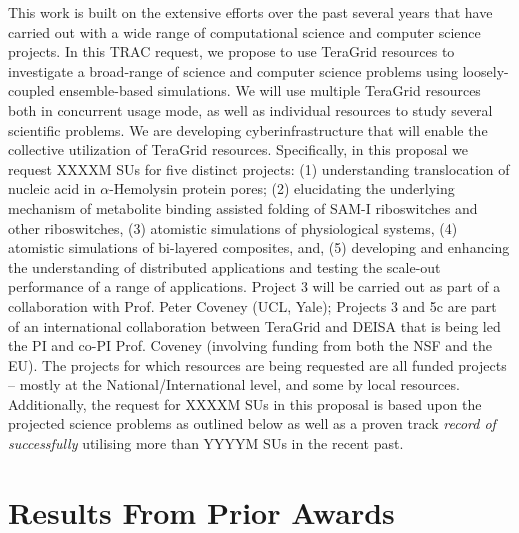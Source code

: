 \documentclass[a4paper,10pt]{article}
\begin{document}
This work is built on the extensive efforts over the past several years that have carried out with a wide range of computational science and computer science projects. In this TRAC request, we propose to use TeraGrid resources to investigate a broad-range of science and computer science problems using loosely-coupled ensemble-based simulations.  We will use multiple TeraGrid resources both in concurrent usage mode, as well as individual resources to study several scientific problems. We are developing  cyberinfrastructure that will enable the collective utilization of TeraGrid resources.  Specifically, in this proposal we request XXXXM SUs for five distinct projects: (1) understanding translocation of nucleic acid in $\alpha$-Hemolysin protein pores; (2) elucidating the underlying mechanism of metabolite binding assisted folding of SAM-I riboswitches and other riboswitches, (3) atomistic simulations of physiological systems, (4) atomistic simulations of bi-layered composites, and, (5) developing and enhancing the understanding of distributed applications and testing the  scale-out performance of a range of applications.  Project 3 will be carried out as part of a collaboration with Prof. Peter Coveney (UCL, Yale); Projects 3 and 5c are part of an international collaboration between TeraGrid and DEISA that is being led the PI and co-PI Prof. Coveney (involving
funding from both the NSF and the EU). The projects for which resources are being requested are all funded projects -- mostly at the National/International level, and some by local resources.  Additionally, the request for XXXXM SUs in this proposal is based upon the projected science problems as outlined below as well as a proven track {\it record of successfully} utilising more than YYYYM SUs in the recent past.

\section{Results From Prior Awards}





\end{document}
